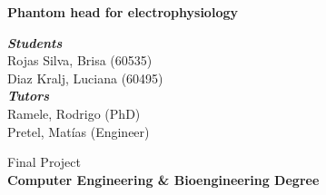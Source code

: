 \begin{titlepage}
	
	
	\thispagestyle{frontpage}
	
	\begin{center}
		
		\vspace*{4\baselineskip}
	
		
		{\Huge \textbf{Phantom head for electrophysiology\\}}
		
		
        \vspace*{1\baselineskip}

        \emph{\textbf{Students}}\\
        Rojas Silva, Brisa (60535)\\
        Diaz Kralj, Luciana (60495)\\
        
        \emph{\textbf{Tutors}}\\
        Ramele, Rodrigo (PhD)\\
        Pretel, Matías (Engineer)\\
		
		\vspace{1\baselineskip}
		
		\large{Final Project}\\
        \large{\textbf{Computer Engineering \& Bioengineering Degree}}\\


		
		\vspace{1\baselineskip}

	\end{center}
	
	\vspace*{4\baselineskip}
	
	
\end{titlepage}
